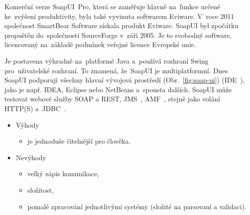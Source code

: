 Komerční verze SoapUI~Pro, která se zaměřuje hlavně na~funkce určené ke~zvýšení produktivity, byla také vyvinuta softwarem Eviware. V~roce 2011 společnost SmartBear Software získala produkt Eviware. SoapUI byl zpočátku propuštěn do~společnosti SourceForge v~září 2005. Je to svobodný software, licencovaný na~základě podmínek veřejné licence Evropské unie. 

Je postavena výhradně na~platformě Java a~používá rozhraní Swing pro~uživatelské rozhraní. To znamená, že~SoapUI je multiplatformní. Dnes SoapUI podporují všechny hlavní vývojová prostředí (Obr.~\ref{fig:soap-ui}) (IDE~\cite{ide}), jako je např. IDEA, Eclipse nebo NetBeans a~spousta dalších. SoapUI může testovat webové služby SOAP a REST, JMS~\cite{jms}, AMF~\cite{amf}, stejně jako volání HTTP(S) a~JDBC~\cite{jdbc}.


\begin{itemize}
	\setlength{\parskip}{0pt}
	\setlength{\itemsep}{0pt}
	\item {Výhody}
	\begin{itemize}
		\setlength{\parskip}{0pt}
		\setlength{\itemsep}{0pt}
		\item {je jednoduše čitelnější pro člověka.}
	\end{itemize}	
	
	\item {Nevýhody}
	\begin{itemize}
		\setlength{\parskip}{0pt}
		\setlength{\itemsep}{0pt}
		\item {velký zápis komunikace,}
		\item {složitost,}
		\item {pomalé zpracování jednotlivými systémy (složité na parsovaní a validaci).}
	\end{itemize}
\end{itemize}

